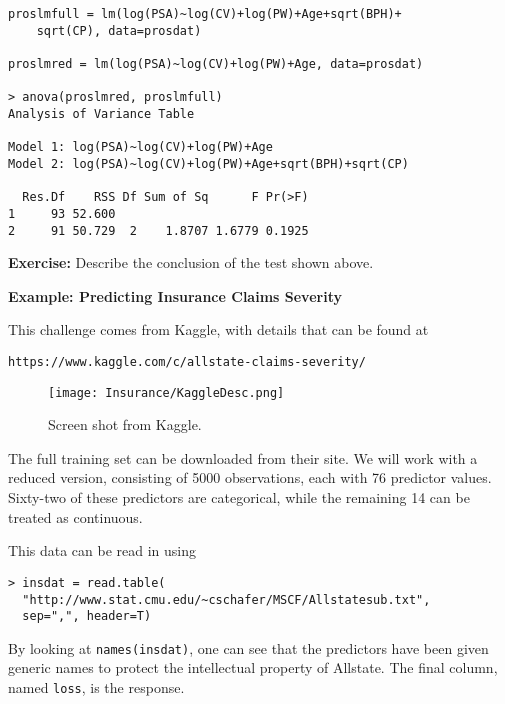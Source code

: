 \documentclass{report}
\begin{document}
\large
\begin{verbatim}
proslmfull = lm(log(PSA)~log(CV)+log(PW)+Age+sqrt(BPH)+
    sqrt(CP), data=prosdat)

proslmred = lm(log(PSA)~log(CV)+log(PW)+Age, data=prosdat)

> anova(proslmred, proslmfull)
Analysis of Variance Table

Model 1: log(PSA)~log(CV)+log(PW)+Age
Model 2: log(PSA)~log(CV)+log(PW)+Age+sqrt(BPH)+sqrt(CP)

  Res.Df    RSS Df Sum of Sq      F Pr(>F)
1     93 52.600                           
2     91 50.729  2    1.8707 1.6779 0.1925
\end{verbatim}

\Large

\textcolor{qcol}{{\bf Exercise:} Describe the conclusion of the test shown
above.}


\newpage
\makerule
{\bf \LARGE Example: Predicting Insurance Claims Severity}

This challenge comes from Kaggle, with details that can be found at

\large
\vspace{-.5in}
\begin{verbatim}
https://www.kaggle.com/c/allstate-claims-severity/
\end{verbatim}
\Large


\begin{figure}[ht]
\begin{center}
\texttt{[image: Insurance/KaggleDesc.png]}
\caption{Screen shot from Kaggle.}
\label{KaggleDesc}
\end{center}
\end{figure}

\newpage
The full training set can be downloaded from their site. We will work with
a reduced version, consisting of 5000 observations, each with 76 predictor
values. Sixty-two of these predictors are categorical, while the remaining
14 can be treated as continuous.

This data can be read in using

\large
\vspace{-.4in}
\begin{verbatim}
> insdat = read.table(
  "http://www.stat.cmu.edu/~cschafer/MSCF/Allstatesub.txt", 
  sep=",", header=T)
\end{verbatim}
\Large

By looking at {\tt names(insdat)}, one can see that the predictors have been
given generic names to protect the intellectual property of Allstate.
The final column, named {\tt loss}, is the response.
\end{document}
